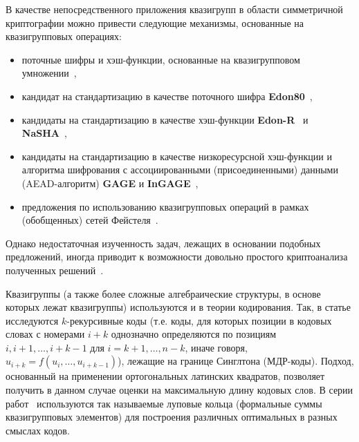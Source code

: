     В качестве непосредственного приложения квазигрупп в области симметричной криптографии можно привести следующие механизмы, основанные на квазигрупповых операциях:
    \begin{itemize}
        \item поточные шифры и хэш-функции, основанные на квазигрупповом умножении~\autocite{markovski1999quasigroup, markovski2003quasigroup, markovski2017quasigroup, snavsel2009hash},
        \item кандидат на стандартизацию в качестве поточного шифра \textbf{Edon80}~\autocite{edon80},
        \item кандидаты на стандартизацию в качестве хэш-функции \textbf{Edon-R}~\autocite{EdonR, EdonRprime} и \textbf{NaSHA}~\autocite{nasha, mileva2009quasigroup},
        \item кандидаты на стандартизацию в качестве низкоресурсной хэш-функции и алгоритма шифрования с ассоциированными (присоединенными) данными (AEAD-алгоритм) \textbf{GAGE} и \textbf{InGAGE}~\autocite{otte2019gage, gligoroski2019s},
        \item предложения по использованию квазигрупповых операций в рамках (обобщенных) сетей Фейстеля~\autocite{tecseleanu2021quasigroups, tecseleanu2022security, tecseleanu2023cryptographic, cherednik17, cherednik19, cherednik20}.
    \end{itemize}
    Однако недостаточная изученность задач, лежащих в основании подобных предложений, иногда приводит к возможности довольно простого криптоанализа полученных решений~\autocite{vojvoda2004cryptanalysis, slaminkova2010cryptanalysis, hell2007key, vojvoda2007note, nikolicfree, li2010collision}.

    Квазигруппы (а также более сложные алгебраические структуры, в основе которых лежат квазигруппы) используются и в теории кодирования.
    Так, в статье \autocite{nechaev98} исследуются $k$-рекурсивные коды (т.е. коды, для которых позиции в кодовых словах с номерами $i+k$ однозначно определяются по позициям $i, i+1, \ldots, i+k-1$ для $i = k+1, \ldots, n-k$, иначе говоря, $u_{i+k} = f(u_i, \ldots, u_{i+k-1})$), лежащие на границе Синглтона (МДР-коды).
    Подход, основанный на применении ортогональных латинских квадратов, позволяет получить в данном случае оценки на максимальную длину кодовых слов.
    В серии работ~\autocite{nechaev04, couselo2004loop, markov12, markov2020nonassociative} используются так называемые луповые кольца (формальные суммы квазигрупповых элементов) для построения различных оптимальных в разных смыслах кодов.

